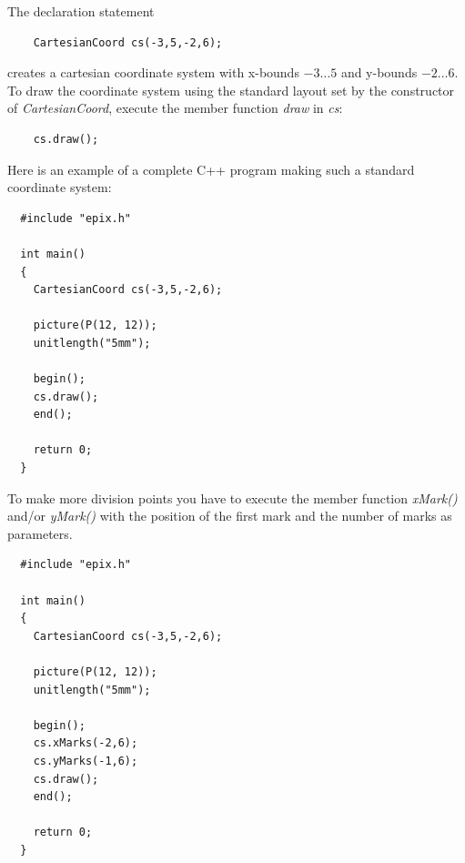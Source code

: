 \documentclass[12pt,a4paper]{article}
\begin{document}
  The declaration statement

  \begin{lstlisting}
    CartesianCoord cs(-3,5,-2,6);
  \end{lstlisting}

  creates a cartesian coordinate system with x-bounds $-3\ldots5$ and y-bounds
  $-2\ldots6$. To draw the coordinate system using the standard layout set by
  the constructor of \textit{CartesianCoord}, execute the member function
  \textit{draw} in \textit{cs}:

  \begin{lstlisting}
    cs.draw();
  \end{lstlisting}

  Here is an example of a complete C++ program making such a standard coordinate
  system:

  \begin{minipage}{7.5cm}
    \begin{lstlisting}
  #include "epix.h"

  int main()
  {
    CartesianCoord cs(-3,5,-2,6);

    picture(P(12, 12));
    unitlength("5mm");

    begin();
    cs.draw();
    end();

    return 0;
  }
    \end{lstlisting}
  \end{minipage}
  \begin{minipage}{5.5cm}
    
  \end{minipage}

  To make more division points you have to execute the member function
  \textit{xMark()} and/or \textit{yMark()} with the position of the first
  mark and the number of marks as parameters.

  \begin{minipage}{7.5cm}
    \begin{lstlisting}
  #include "epix.h"

  int main()
  {
    CartesianCoord cs(-3,5,-2,6);

    picture(P(12, 12));
    unitlength("5mm");

    begin();
    cs.xMarks(-2,6);
    cs.yMarks(-1,6);
    cs.draw();
    end();

    return 0;
  }
    \end{lstlisting}
  \end{minipage}
  \begin{minipage}{5.5cm}
      
  \end{minipage}
\end{document}
